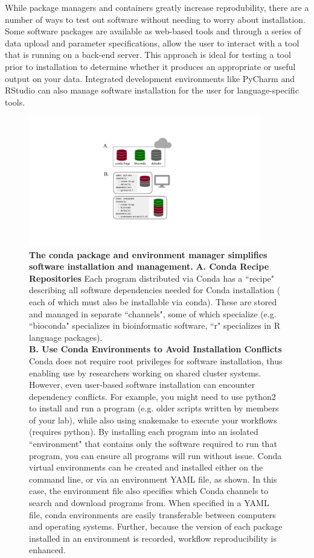 \documentclass[10pt,letterpaper]{article}
\begin{document}
While package managers and containers greatly increase reprodubility, there are a number of ways to test out software without needing to worry about installation. 
Some software packages are available as web-based tools and through a series of data upload and parameter specifications, allow the user to interact with a tool that is running on a back-end server. 
This approach is ideal for testing a tool prior to installation to determine whether it produces an appropriate or useful output on your data. 
Integrated development environments like PyCharm and RStudio can also manage software installation for the user for language-specific tools. 

\begin{figure}
\includegraphics[width=0.9\textwidth]{figures/conda_figure.pdf}
\caption{\textbf{The conda package and environment manager simplifies software installation and management.}
\textbf{A. Conda Recipe Repositories} Each program distributed via Conda has a ``recipe" describing all software dependencies needed for Conda installation ( each of which must also be installable via conda). These are stored and managed in separate ``channels", some of which specialize (e.g. ``bioconda" specializes in bioinformatic software, ``r" specializes in R language packages). \\
\textbf{B. Use Conda Environments to Avoid Installation Conflicts}  Conda does not require root privileges for software installation, thus enabling use by researchers working on shared cluster systems. However, even user-based software installation can encounter dependency conflicts. For example, you might need to use python2 to install and run a program (e.g. older scripts written by members of your lab), while also using snakemake to execute your workflows (requires python). By installing each program into an isolated ``environment" that contains only the software required to run that program, you can ensure all programs will run without issue. Conda virtual environments can be created and installed either on the command line, or via an environment YAML file, as shown. In this case, the environment file also specifies which Conda channels to search and download programs from. When specified in a YAML file, conda environments are easily transferable between computers and operating systems. Further, because the version of each package installed in an environment is recorded, workflow reproducibility is enhanced.   
}
\label{fig:conda_figure}
\end{figure}
\end{document}
